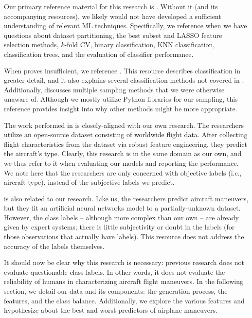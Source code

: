 \documentclass[11pt]{article}
\begin{document}

Our primary reference material for this research is \cite{James2013}. Without it (and its accompanying resources), we likely would not have developed a sufficient understanding of relevant \ac{ML} techniques. Specifically, we reference \cite{James2013} when we have questions about dataset partitioning, the best subset and \ac{LASSO} feature selection methods, $k$-fold \ac{CV}, binary classification, \ac{KNN} classification, classification trees, and the evaluation of classifier performance.

When \cite{James2013} proves insufficient, we reference \cite{Bishop2006}. This resource describes classification in greater detail, and it also explains several classification methods not covered in \cite{James2013}. Additionally, \cite{Bishop2006} discusses multiple sampling methods that we were otherwise unaware of. Although we mostly utilize Python libraries for our sampling, this reference provides insight into why other methods might be more appropriate.

The work performed in \cite{Blanks2017} is closely-aligned with our own research. The researchers utilize an open-source dataset consisting of worldwide flight data. After collecting flight characteristics from the dataset via robust feature engineering, they predict the aircraft's type. Clearly, this research is in the same domain as our own, and we thus refer to it when evaluating our models and reporting the performance. We note here that the researchers are only concerned with objective labels (i.e., aircraft type), instead of the subjective labels we predict.

\cite{Rodin1992} is also related to our research. Like us, the researchers predict aircraft maneuvers, but they fit an artificial neural networks model to a partially-unknown dataset. However, the class labels -- although more complex than our own -- are already given by expert systems; there is little subjectivity or doubt in the labels (for those observations that actually have labels). This resource does not address the accuracy of the labels themselves.


It should now be clear why this research is necessary: previous research does not evaluate questionable class labels. In other words, it does not evaluate the reliability of humans in characterizing aircraft flight maneuvers. In the following section, we detail our data and its components: the generation process, the features, and the class balance. Additionally, we explore the various features and hypothesize about the best and worst predictors of airplane maneuvers.
\end{document}
